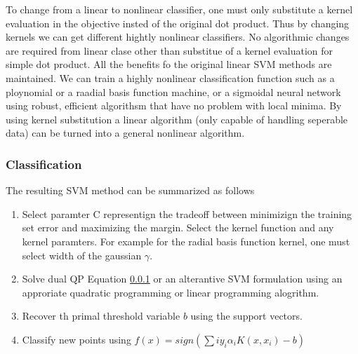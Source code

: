 To change from a linear to nonlinear classifier, one must only substitute a kernel evaluation in the objective insted of the original dot product. Thus by changing kernels we can get different hightly nonlinear classifiers. No algorithmic changes are required from linear clase other than substitue of a kernel evaluation for simple dot product. All the benefits fo the original linear SVM methods are maintained. We can train a highly nonlinear classification function such as a ploynomial or a raadial basis function machine, or a sigmoidal neural network using robust, efficient algorithsm that have no problem with local minima. By using kernel substitution a linear algorithm (only capable of handling seperable data) can be turned into a general nonlinear algorithm. 
 
\subsubsection{Classification}
The resulting SVM method can be summarized as follows 
\begin{enumerate}
	\item Select paramter C representign the tradeoff between minimizign the training set error and maximizing the margin. Select the kernel function and any kernel paramters. For example for the radial basis function kernel, one must select width of the gaussian $\gamma$. 
	\item Solve dual QP Equation \ref{} or an alterantive SVM formulation using an approriate quadratic programming or linear programming alogrithm. 
	\item Recover th primal threshold variable $b$ using the support vectors. 
	\item Classify new points using $f(x)=sign\left(\sum{i}y_i\alpha_i K\left(x,x_i\right)-b\right)$
\end{enumerate}

